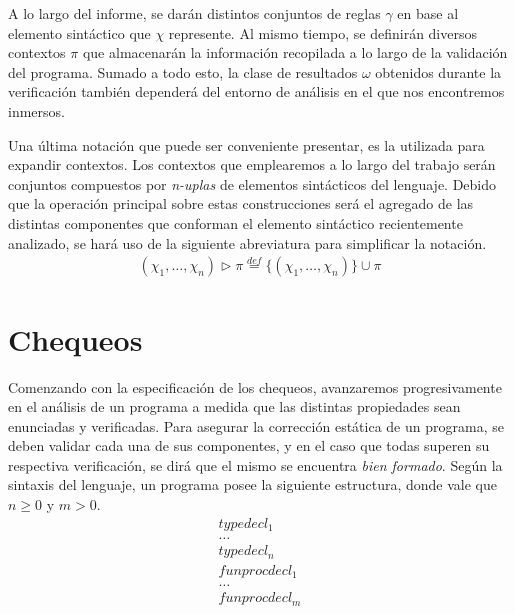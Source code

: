 A lo largo del informe, se darán distintos conjuntos de reglas $\gamma$ en base al elemento sintáctico que $\chi$ represente.
Al mismo tiempo, se definirán diversos contextos $\pi$ que almacenarán la información recopilada a lo largo de la validación del programa.
Sumado a todo esto, la clase de resultados $\omega$ obtenidos durante la verificación también dependerá del entorno de análisis en el que nos encontremos inmersos.

Una última notación que puede ser conveniente presentar, es la utilizada para expandir contextos.
Los contextos que emplearemos a lo largo del trabajo serán conjuntos compuestos por \textit{n-uplas} de elementos sintácticos del lenguaje.
Debido que la operación principal sobre estas construcciones será el agregado de las distintas componentes que conforman el elemento sintáctico recientemente analizado, se hará uso de la siguiente abreviatura para simplificar la notación.
\begin{gather*}
(\chi_1, \ldots, \chi_n) \triangleright \pi \overset{def}{=} \{ (\chi_1, \ldots, \chi_n) \} \cup \pi
\end{gather*}

\section{Chequeos}

Comenzando con la especificación de los chequeos, avanzaremos progresivamente en el análisis de un programa a medida que las distintas propiedades sean enunciadas y verificadas.
Para asegurar la corrección estática de un programa, se deben validar cada una de sus componentes, y en el caso que todas superen su respectiva verificación, se dirá que el mismo se encuentra \textit{bien formado}.
Según la sintaxis del lenguaje, un programa posee la siguiente estructura, donde vale que $n \geq 0$ y $m > 0$.
\begin{gather*}
typedecl_1 \\
\ldots \\
typedecl_n \\
funprocdecl_1 \\
\ldots \\
funprocdecl_m
\end{gather*}